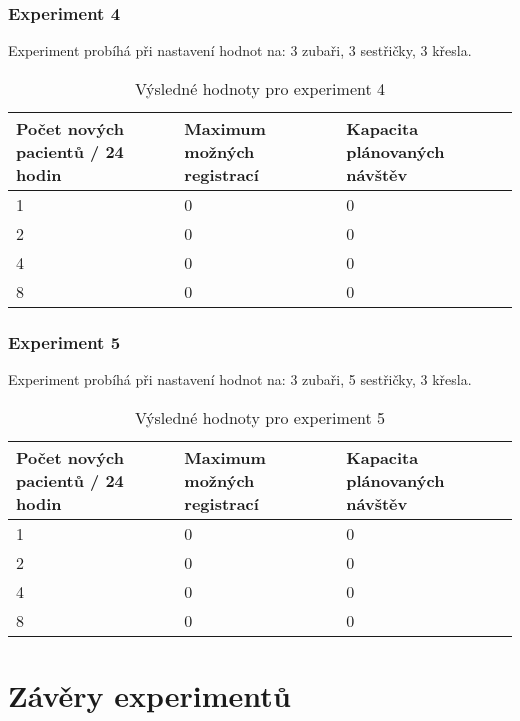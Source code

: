 \documentclass[a4paper,11pt,titlepage]{article}
\begin{document}
\subsubsection{Experiment 4}

Experiment probíhá při nastavení hodnot na: 3 zubaři, 3 sestřičky, 3 křesla.

\begin{table}[h]
\centering
\begin{tabular}{|l|l|l|}
\hline
Počet nových pacientů / 24 hodin & Maximum možných registrací & Kapacita plánovaných návštěv \\ \hline
1        & 0                	& 0           		\\ \hline
2       & 0          		& 0           		\\ \hline
4       & 0   			& 0        		\\ \hline
8       & 0   			& 0           		\\ \hline
\end{tabular}
\caption {Výsledné hodnoty pro experiment 4} \label{tab:title} 
\end{table}

\subsubsection{Experiment 5}

Experiment probíhá při nastavení hodnot na: 3 zubaři, 5 sestřičky, 3 křesla.

\begin{table}[h]
\centering
\begin{tabular}{|l|l|l|}
\hline
Počet nových pacientů / 24 hodin & Maximum možných registrací & Kapacita plánovaných návštěv \\ \hline
1        & 0                	& 0           		\\ \hline
2       & 0          		& 0           		\\ \hline
4       & 0   			& 0        		\\ \hline
8       & 0   			& 0           		\\ \hline
\end{tabular}
\caption {Výsledné hodnoty pro experiment 5} \label{tab:title} 
\end{table}

\section{Závěry experimentů}
\end{document}
